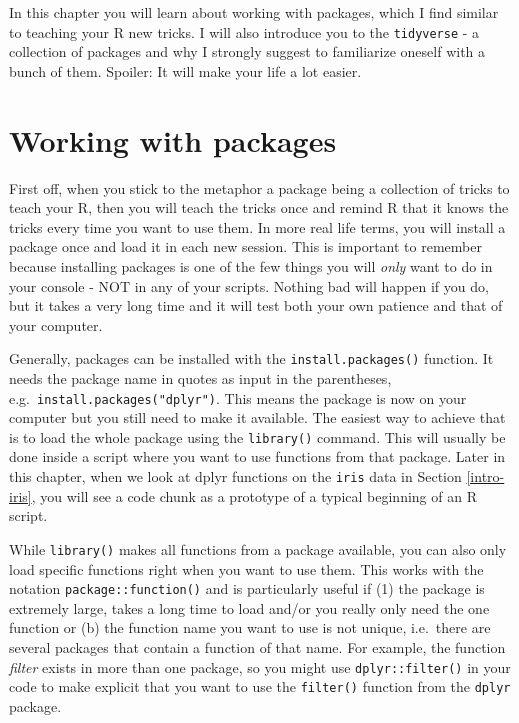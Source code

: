 \documentclass[
]{book}
\begin{document}
In this chapter you will learn about working with packages, which I find similar to teaching your R new tricks.
I will also introduce you to the \texttt{tidyverse} - a collection of packages and why I strongly suggest to familiarize oneself with a bunch of them.
Spoiler: It will make your life a lot easier.

\section{Working with packages}\label{working-with-packages}

First off, when you stick to the metaphor a package being a collection of tricks to teach your R, then you will teach the tricks once and remind R that it knows the tricks every time you want to use them.
In more real life terms, you will install a package once and load it in each new session.
This is important to remember because installing packages is one of the few things you will \emph{only} want to do in your console - NOT in any of your scripts.
Nothing bad will happen if you do, but it takes a very long time and it will test both your own patience and that of your computer.

Generally, packages can be installed with the \texttt{install.packages()} function.
It needs the package name in quotes as input in the parentheses, e.g.~\texttt{install.packages("dplyr")}.
This means the package is now on your computer but you still need to make it available.
The easiest way to achieve that is to load the whole package using the \texttt{library()} command.
This will usually be done inside a script where you want to use functions from that package.
Later in this chapter, when we look at dplyr functions on the \texttt{iris} data in Section \ref{intro-iris}, you will see a code chunk as a prototype of a typical beginning of an R script.

While \texttt{library()} makes all functions from a package available, you can also only load specific functions right when you want to use them.
This works with the notation \texttt{package::function()} and is particularly useful if (1) the package is extremely large, takes a long time to load and/or you really only need the one function or (b) the function name you want to use is not unique, i.e.~there are several packages that contain a function of that name.
For example, the function \emph{filter} exists in more than one package, so you might use \texttt{dplyr::filter()} in your code to make explicit that you want to use the \texttt{filter()} function from the \texttt{dplyr} package.
\end{document}
